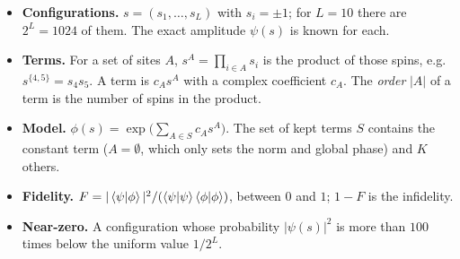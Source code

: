 \documentclass[11pt,a4paper]{article}
\begin{document}
\begin{definition}
\begin{itemize}
  \item \textbf{Configurations.} $s=(s_1,\dots,s_L)$ with $s_i=\pm1$; for $L=10$ there are $2^L=1024$ of them. The exact amplitude $\psi(s)$ is known for each.
  \item \textbf{Terms.} For a set of sites $A$, $s^A=\prod_{i\in A}s_i$ is the product of those spins, e.g.\ $s^{\{4,5\}}=s_4s_5$. A term is $c_As^A$ with a complex coefficient $c_A$. The \emph{order} $|A|$ of a term is the number of spins in the product.
  \item \textbf{Model.} $\phi(s)=\exp\bigl(\sum_{A\in S}c_As^A\bigr)$. The set of kept terms $S$ contains the constant term ($A=\emptyset$, which only sets the norm and global phase) and $K$ others.
  \item \textbf{Fidelity.} $F=|\braket{\psi|\phi}|^2/(\braket{\psi|\psi}\braket{\phi|\phi})$, between $0$ and $1$; $1-F$ is the infidelity.
  \item \textbf{Near-zero.} A configuration whose probability $|\psi(s)|^2$ is more than $100$ times below the uniform value $1/2^L$.
\end{itemize}
\end{definition}
\end{document}

